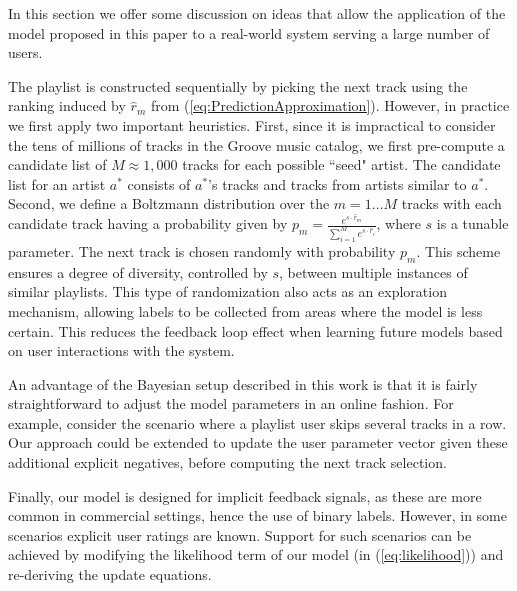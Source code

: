 In this section we offer some discussion on ideas that allow the application of the model proposed in this paper to a real-world system serving a large number of users.

The playlist is constructed sequentially by picking the next track using the ranking induced by $\hat{r}_m$ from (\ref{eq:PredictionApproximation}). However, in practice we first apply two important heuristics. First, since it is impractical to consider the tens of millions of tracks in the Groove music catalog, we first pre-compute a candidate list of $M \approx 1,000$ tracks for each possible ``seed" artist.
The candidate list for an artist $a^*$ consists of $a^*$'s tracks and tracks from artists similar to $a^*$. Second, we define a Boltzmann distribution over the $m=1 \dots M$ tracks with each candidate track having a probability given by $p_m=\frac{e^{s \cdot \hat{r}_m}}{\sum_{i=1}^M e^{s \cdot \hat{r}_i}}$, where $s$ is a tunable parameter. The next track is chosen randomly with probability $p_m$. This scheme ensures a degree of diversity, controlled by $s$, between multiple instances of similar playlists. This type of randomization also acts as an exploration mechanism, allowing labels to be collected from areas where the model is less certain. This reduces the feedback loop effect when learning future models based on user interactions with the system.



An advantage of the Bayesian setup described in this work is that it is fairly straightforward to adjust the model parameters in an online fashion. For example, consider the scenario where a playlist user skips several tracks in a row. Our approach could be extended to update the user parameter vector given these additional explicit negatives, before computing the next track selection.

Finally, our model is designed for implicit feedback signals, as these are more common in commercial settings, hence the use of binary labels. However, in some scenarios explicit user ratings are known. Support for such scenarios can be achieved by modifying the likelihood term of our model (in (\ref{eq:likelihood})) and re-deriving the update equations.
  